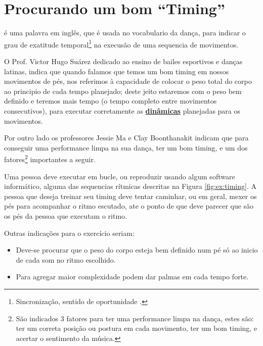 
\section{Procurando um bom ``Timing''}
\label{sec:dancetimming}

\begin{definition}[Timing:]
é uma palavra em inglês, que é usada no vocabulario da dança, 
para indicar o grau de exatitude temporal\footnote{%
Sincronização,
sentido de oportunidade \cite{TimingDef}.} 
na execusão de uma sequencia de movimentos.%
\end{definition}

O Prof. Victor Hugo Suárez dedicado ao ensino de bailes esportivos e danças latinas,
indica que quando falamos que temos um bom timing \cite{TimingDef2} em nossos movimentos de pés, 
nos referimos à capacidade de colocar o peso total do corpo ao principio de cada tempo planejado;
deste jeito estaremos com o peso bem definido e teremos mais tempo 
(o tempo completo entre movimentos  consecutivos), 
para executar corretamente as \hyperref[sec:musicalidade:dinamicas]{\textbf{dinâmicas}} 
planejadas para os movimentos.

Por outro lado os professores Jessie Ma e Clay Boonthanakit
indicam \cite{TimingDef3} que para conseguir uma performance limpa na sua dança,
ter um bom timing, e
um dos fatores\footnote{São indicados 3 fatores para ter uma performance limpa na dança,
estes são: ter um correta posição ou postura em cada movimento, ter um bom timing, e 
acertar o sentimento da música.} importantes a seguir.

\begin{example}
\label{ex:timing1}
Uma pessoa deve executar em bucle, ou reproduzir usando algum software informático,
alguma das sequencias rítmicas descritas na Figura \ref{fig:ex:timing}.
A pessoa que deseja treinar seu timing deve tentar caminhar, ou em geral, 
mexer os pés para acompanhar o ritmo escutado,
ate o ponto de que deve parecer que são os pés da pessoa que executam o ritmo.

Outras indicações para o exercício seriam:
\begin{itemize}
\item Deve-se procurar que o peso do corpo esteja bem definido num pé só 
ao inicio de cada som no ritmo escolhido.
\item Para agregar maior complexidade podem dar palmas em cada tempo forte.
\end{itemize}
\end{example}



